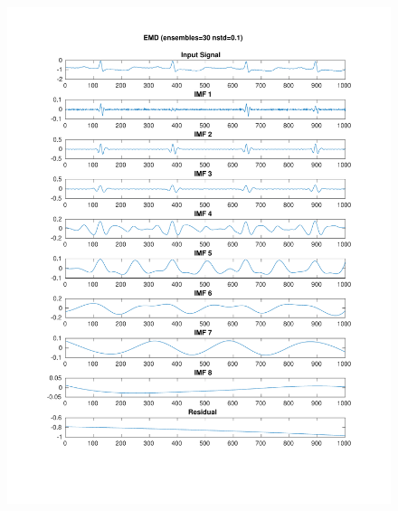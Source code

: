 \documentclass[11pt,a4paper]{article}
\begin{document}
\begin{figure}[H]
\centering
\begin{minipage}{0.48\textwidth}
	\centering
	\includegraphics[width=\textwidth]{fig/112l1_emd_ensemble.pdf}
\end{minipage}
\begin{minipage}{0.48\textwidth}
	\centering

\end{minipage}
\end{figure}
\end{document}
